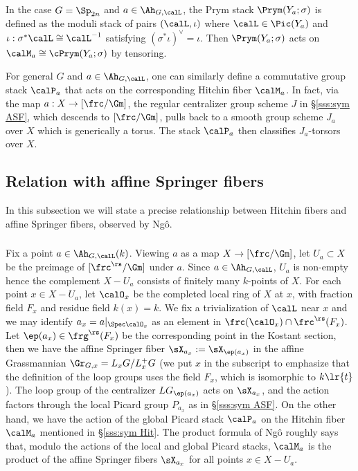 In the case $G=\Sp_{2n}$ and $a\in\Ah_{G,\calL}$, the Prym stack $\Prym(Y_{a};\sigma)$ is defined as the moduli stack of pairs $(\calL,\iota)$ where $\calL\in\Pic(Y_{a})$ and $\iota:\sigma^*\calL\cong\calL^{-1}$ satisfying $(\sigma^{*}\iota)^{\vee}=\iota$. Then $\Prym(Y_{a};\sigma)$ acts on $\calM_{a}\cong\cPrym(Y_{a};\sigma)$ by tensoring.

For general $G$ and $a\in\Ah_{G,\calL}$, one can similarly define a commutative group stack $\calP_{a}$ that acts on the corresponding Hitchin fiber $\calM_{a}$. In fact, via the map $a:X\to [\frc/\Gm]$, the regular centralizer group scheme $J$ in \S\ref{sss:sym ASF}, which descends to $[\frc/\Gm]$, pulls back to a smooth group scheme $J_{a}$ over $X$ which is generically a torus. The stack $\calP_{a}$ then classifies $J_{a}$-torsors over $X$. 


\subsection{Relation with affine Springer fibers}\label{ss:rel Hit ASF}
In this subsection we will state a precise relationship between Hitchin fibers and affine Springer fibers, observed by Ng\^o. 

\subsubsection{} Fix a point $a\in\Ah_{G,\calL}(k)$. Viewing $a$ as a map $X\to [\frc/\Gm]$, let $U_{a}\subset X$ be the preimage of $[\frc^{\rs}/\Gm]$ under $a$. Since $a\in\Ah_{G,\calL}$, $U_{a}$ is non-empty hence the complement $X-U_{a}$ consists of finitely many $k$-points of $X$.  For each point $x\in X-U_{a}$, let $\calO_{x}$ be the completed local ring of $X$ at $x$, with fraction field $F_{x}$ and residue field $k(x)=k$.  We fix a trivialization of $\calL$ near $x$ and we may identify $a_{x}=a|_{\Spec\calO_{x}}$ as an element in $\frc(\calO_{x})\cap\frc^{\rs}(F_{x})$. Let $\ep(a_{x})\in\frg^{\rs}(F_{x})$ be the corresponding point in the Kostant section, then we have the affine Springer fiber $\sX_{a_{x}}:=\sX_{\ep(a_{x})}$ in the affine Grassmannian $\Gr_{G, x}=L_{x}G/L^{+}_{x}G$ (we put $x$ in the subscript to emphasize that the definition of the loop groups uses the field $F_{x}$, which is isomorphic to $k\lr{t}$). The loop group of the centralizer $LG_{\ep(a_{x})}$ acts on $\sX_{a_{x}}$, and the action  factors through the local Picard group $P_{a_{x}}$ as in \S\ref{sss:sym ASF}. On the other hand, we have the action of the global Picard stack $\calP_{a}$ on the Hitchin fiber $\calM_{a}$ mentioned in \S\ref{sss:sym Hit}. The product formula of Ng\^o roughly says that, modulo the actions of the local and global Picard stacks, $\calM_{a}$ is the product of the affine Springer fibers $\sX_{a_{x}}$ for all points $x\in X-U_{a}$.

